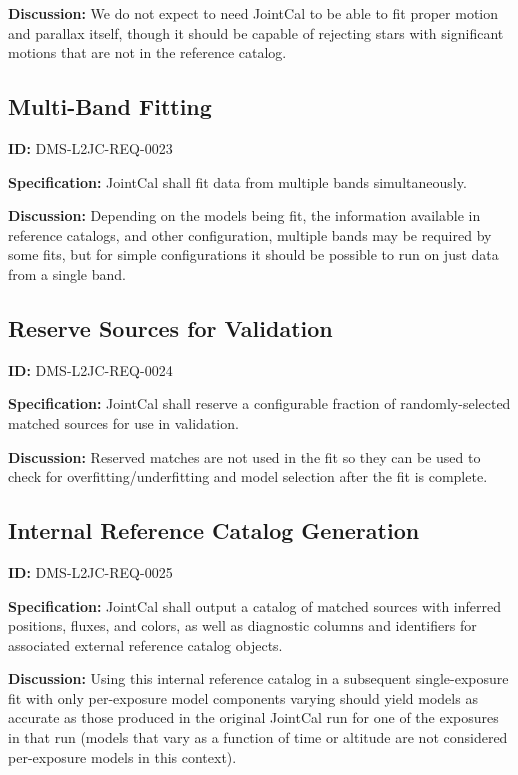 \documentclass[SE,toc,lsstdraft]{lsstdoc}
\begin{document}
\textbf{Discussion:}
We do not expect to need JointCal to be able to fit proper motion and parallax itself, though it should be capable of rejecting stars with significant motions that are not in the reference catalog.

\subsection{Multi-Band Fitting}

\label{DMS-L2JC-REQ-0023}
\textbf{ID:} DMS-L2JC-REQ-0023

\textbf{Specification:}
JointCal shall fit data from multiple bands simultaneously.

\textbf{Discussion:}
Depending on the models being fit, the information available in reference catalogs, and other configuration, multiple bands may be required by some fits, but for simple configurations it should be possible to run on just data from a single band.

\subsection{Reserve Sources for Validation}

\label{DMS-L2JC-REQ-0024}
\textbf{ID:} DMS-L2JC-REQ-0024

\textbf{Specification:}
JointCal shall reserve a configurable fraction of randomly-selected matched sources for use in validation.

\textbf{Discussion:}
Reserved matches are not used in the fit so they can be used to check for overfitting/underfitting and model selection after the fit is complete.

\subsection{Internal Reference Catalog Generation}

\label{DMS-L2JC-REQ-0025}
\textbf{ID:} DMS-L2JC-REQ-0025

\textbf{Specification:}
JointCal shall output a catalog of matched sources with inferred positions, fluxes, and colors, as well as diagnostic columns and identifiers for associated external reference catalog objects.

\textbf{Discussion:}
Using this internal reference catalog in a subsequent single-exposure fit with only per-exposure model components varying should yield models as accurate as those produced in the original JointCal run for one of the exposures in that run (models that vary as a function of time or altitude are not considered per-exposure models in this context).
\end{document}
